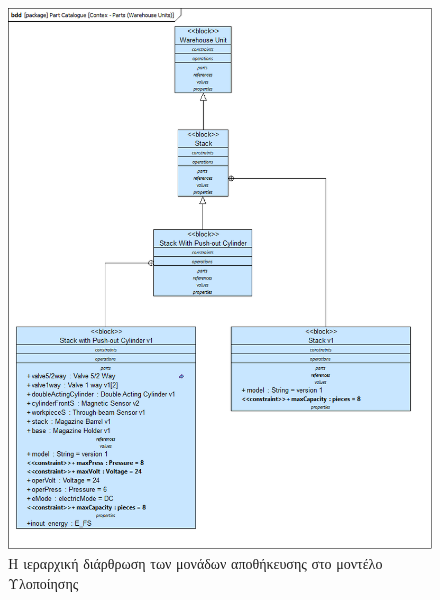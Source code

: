 \documentclass[a4paper,12pt,twoside]{report}
\begin{document}
\begin{appendices}
				\begin{figure}[hp]
					\centering
					\includegraphics[scale=0.50]{DesignModel_Contex-Parts(WarehouseUnits).png}
					\caption{Η ιεραρχική διάρθρωση των μονάδων αποθήκευσης στο μοντέλο Υλοποίησης}
					\label{φωτ:Η ιεραρχική διάρθρωση των μονάδων αποθήκευσης στο μοντέλο Υλοποίησης}
				\end{figure}
				

\end{appendices}
\end{document}
